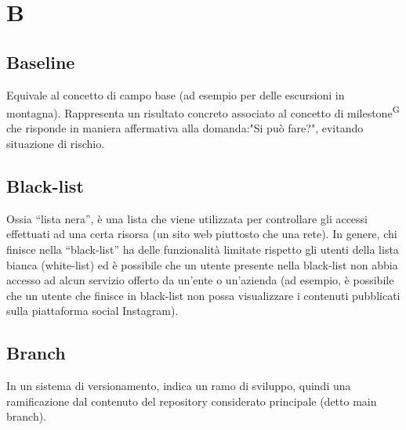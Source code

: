 \section{B}


\subsection{Baseline} 
Equivale al concetto di campo base (ad esempio per delle escursioni in montagna). Rappresenta un risultato concreto associato al concetto di milestone\textsuperscript{G} che risponde in maniera affermativa alla domanda:"Si può fare?", evitando situazione di rischio.


\subsection{Black-list} Ossia “lista nera”, è una lista che viene utilizzata per controllare gli accessi effettuati ad una certa risorsa (un sito web piuttosto che una rete). In genere, chi finisce nella “black-list” ha delle funzionalità limitate rispetto gli utenti della lista bianca (white-list) ed è possibile che un utente presente nella black-list non abbia accesso ad alcun servizio offerto da un’ente o un’azienda (ad esempio, è possibile che un utente che finisce in black-list non possa visualizzare i contenuti pubblicati sulla piattaforma social Instagram). 



\subsection{Branch}
In un sistema di versionamento, indica un ramo di sviluppo, quindi una ramificazione dal contenuto del repository considerato principale (detto main branch). 


\clearpage